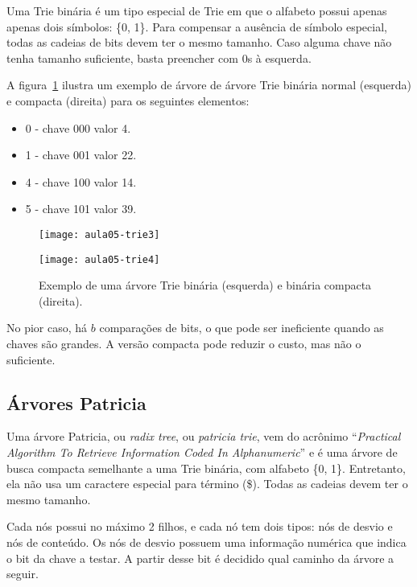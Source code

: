 Uma Trie binária é um tipo especial de Trie em que o alfabeto possui apenas 
apenas dois símbolos: \{0, 1\}.
Para compensar a ausência de símbolo especial, todas as cadeias de bits devem
ter o mesmo tamanho.
Caso alguma chave não tenha tamanho suficiente, basta preencher com 0s à
esquerda.

A figura~\ref{aula05:fig:trie3} ilustra um exemplo de árvore de árvore Trie binária
normal (esquerda) e compacta (direita) para os seguintes elementos:
\begin{itemize}
\item 0 - chave 000 valor 4.
\item 1 - chave 001 valor 22.
\item 4 - chave 100 valor 14.
\item 5 - chave 101 valor 39.
\end{itemize}
%
\begin{figure}[!htb]
\centering
  \begin{minipage}{0.4\textwidth}
	\centering
	\texttt{[image: aula05-trie3]}
  \end{minipage}
  \vline
  \begin{minipage}{0.4\textwidth}
	\centering
	\texttt{[image: aula05-trie4]}
  \end{minipage}
\caption{Exemplo de uma árvore Trie binária (esquerda) e binária compacta (direita).}
\label{aula05:fig:trie3}
\end{figure}

No pior caso, há $b$ comparações de bits, o que pode ser ineficiente quando as
chaves são grandes.  A versão compacta pode reduzir o custo, mas não o
suficiente.

\subsection{Árvores Patricia}

Uma árvore Patricia, ou \emph{radix tree}, ou \emph{patricia trie}, vem do
acrônimo ``\emph{Practical Algorithm To Retrieve Information Coded In
Alphanumeric}'' e é uma árvore de busca compacta semelhante a uma Trie binária,
com alfabeto \{0, 1\}.
Entretanto, ela não usa um caractere especial para término (\$).
Todas as cadeias devem ter o mesmo tamanho.

Cada nós possui no máximo 2 filhos, e cada nó tem dois tipos: nós de desvio e nós de conteúdo.
Os nós de desvio possuem uma informação numérica que indica o bit da chave a testar.
A partir desse bit é decidido qual caminho da árvore a seguir.

